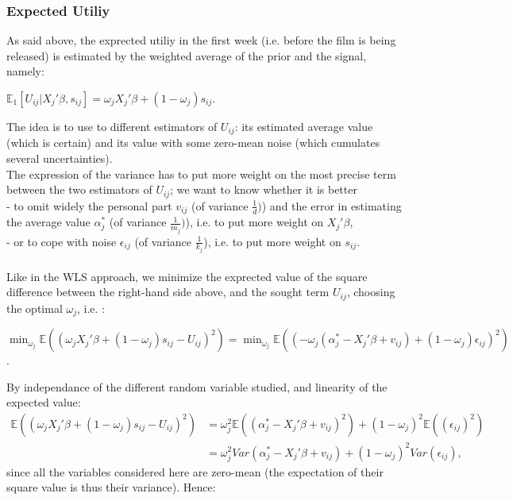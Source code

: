 \subsubsection{Expected Utiliy}
As said above, the exprected utiliy in the first week (i.e. before the film is being released) is estimated by the weighted average of the prior and the signal, namely:
\begin{center}
	$\mathbb{E}_1[U_{i j}|X_{j}'\beta, s_{i j}]=\omega_{j} X_{j}'\beta+(1-\omega_{j})s_{i j}$.
\end{center}
The idea is to use to different estimators of $U_{i j}$: its estimated average value (which is certain) and its value with some zero-mean noise (which cumulates several uncertainties).\\
The expression of the variance has to put more weight on the most precise term between the two estimators of $U_{i j}$; we want to know whether it is better \\
- to omit widely the personal part $v_{i j}$ (of variance $\frac{1}{d})$) and the error in estimating the average value $\alpha_{j}^{*}$ (of variance $\frac{1}{m_{j}})$), i.e. to put more weight on $X_{j}'\beta$,\\
- or to cope with noise $\epsilon_{i j}$ (of variance $\frac{1}{k_{j}}$), i.e. to put more weight on $s_{i j}$.\\
\\
Like in the WLS approach, we minimize the exprected value of the square difference between the right-hand side above, and the sought term $U_{i j}$, choosing the optimal $\omega_{j}$, i.e. :
\begin{center}
	$\min_{\omega_{j}} \mathbb{E}((\omega_{j} X_{j}'\beta+(1-\omega_{j})s_{i j}-U_{i j})^{2})=\min_{\omega_{j}} \mathbb{E}((-\omega_{j} (\alpha_{j}^{*}-X_{j}'\beta+v_{i j})+(1-\omega_{j})\epsilon_{i j})^{2})$.
\end{center}
	By independance of the different random variable studied, and linearity of the expected value:
	\begin{align*}
	\mathbb{E}((\omega_{j} X_{j}'\beta+(1-\omega_{j})s_{i j}-U_{i j})^2)&=\omega_{j}^{2}\mathbb{E}((\alpha_{j}^{*}-X_{j}'\beta+v_{i j})^{2})+(1-\omega_{j})^{2}\mathbb{E}((\epsilon_{i j})^{2})\\
	&=\omega_{j}^{2}Var(\alpha_{j}^{*}-X_{j}'\beta+v_{i j})+(1-\omega_{j})^{2}Var(\epsilon_{i j}),
	\end{align*}
	since all the variables considered here are zero-mean (the expectation of their square value is thus their variance). Hence:
